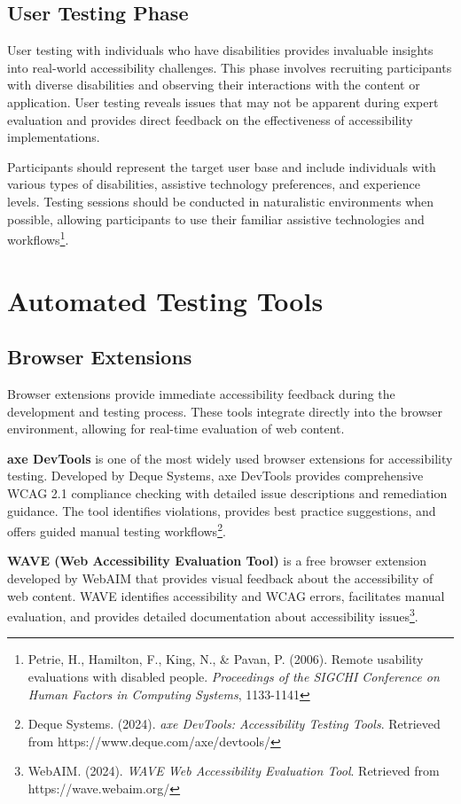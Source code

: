 \subsection{User Testing Phase}

User testing with individuals who have disabilities provides invaluable insights into real-world accessibility challenges. This phase involves recruiting participants with diverse disabilities and observing their interactions with the content or application. User testing reveals issues that may not be apparent during expert evaluation and provides direct feedback on the effectiveness of accessibility implementations.

Participants should represent the target user base and include individuals with various types of disabilities, assistive technology preferences, and experience levels. Testing sessions should be conducted in naturalistic environments when possible, allowing participants to use their familiar assistive technologies and workflows\footnote{Petrie, H., Hamilton, F., King, N., \& Pavan, P. (2006). Remote usability evaluations with disabled people. \textit{Proceedings of the SIGCHI Conference on Human Factors in Computing Systems}, 1133-1141}.

\section{Automated Testing Tools}
\label{sec:automated-tools}

\subsection{Browser Extensions}

Browser extensions provide immediate accessibility feedback during the development and testing process. These tools integrate directly into the browser environment, allowing for real-time evaluation of web content.

\textbf{axe DevTools} is one of the most widely used browser extensions for accessibility testing. Developed by Deque Systems, axe DevTools provides comprehensive WCAG 2.1 compliance checking with detailed issue descriptions and remediation guidance. The tool identifies violations, provides best practice suggestions, and offers guided manual testing workflows\footnote{Deque Systems. (2024). \textit{axe DevTools: Accessibility Testing Tools}. Retrieved from https://www.deque.com/axe/devtools/}.

\textbf{WAVE (Web Accessibility Evaluation Tool)} is a free browser extension developed by WebAIM that provides visual feedback about the accessibility of web content. WAVE identifies accessibility and WCAG errors, facilitates manual evaluation, and provides detailed documentation about accessibility issues\footnote{WebAIM. (2024). \textit{WAVE Web Accessibility Evaluation Tool}. Retrieved from https://wave.webaim.org/}.

